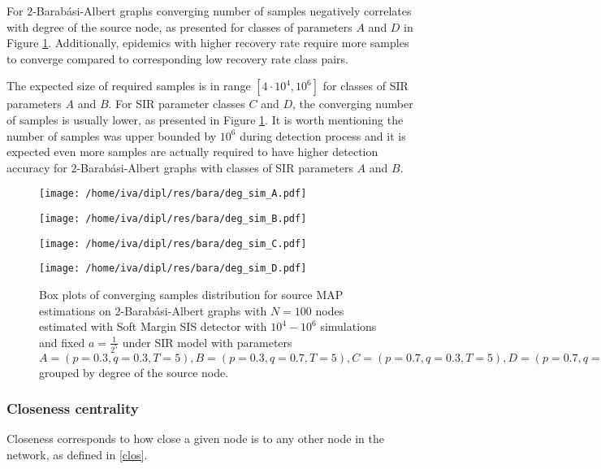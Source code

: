 \documentclass[times, utf8, diplomski]{fer}
\begin{document}
For $2$-Barab\'{a}si-Albert graphs converging number of samples negatively correlates with degree of the source node, as presented for classes of parameters $A$ and $D$ in Figure \ref{bara_sim_deg}. Additionally, epidemics with higher recovery rate require more samples to converge compared to corresponding low recovery rate class pairs. 

The expected size of required samples is in range $[4 \cdot 10^4, 10^6]$ for classes of SIR parameters $A$ and $B$.  For SIR parameter classes $C$ and $D$, the converging number of samples is usually lower, as presented in Figure \ref{bara_sim_deg}. It is worth mentioning the number of  samples was upper bounded  by $10^6$ during detection process and it is expected even more samples are actually required to have higher detection accuracy for $2$-Barab\'{a}si-Albert graphs with classes of SIR parameters $A$ and $B$.

\begin{figure}[H]
\begin{minipage}{0.5\textwidth}
\texttt{[image: /home/iva/dipl/res/bara/deg\_sim\_A.pdf]}
\end{minipage}
\begin{minipage}{0.5\textwidth}
\texttt{[image: /home/iva/dipl/res/bara/deg\_sim\_B.pdf]}
\end{minipage}
\begin{minipage}{0.5\textwidth}
\texttt{[image: /home/iva/dipl/res/bara/deg\_sim\_C.pdf]}
\end{minipage}
\begin{minipage}{0.5\textwidth}
\texttt{[image: /home/iva/dipl/res/bara/deg\_sim\_D.pdf]}
\end{minipage}
\caption{Box plots of converging samples distribution for source MAP estimations on  $2$-Barab\'{a}si-Albert graphs  with $N=100$ nodes estimated with Soft Margin SIS detector with $10^4 - 10^6$ simulations and fixed $a = \frac{1}{2^5}$ under SIR model with parameters $A = (p=0.3, q=0.3, T=5), B = (p=0.3, q=0.7, T=5), C = (p=0.7, q=0.3, T=5), D = (p=0.7, q=0.7, T=5)$ grouped by degree of the source node.}
\label{bara_sim_deg} 
\end{figure}

\subsubsection{Closeness centrality}

Closeness corresponds to how close a given node is to any other node in the network, as defined in \ref{clos}. 
\end{document}
